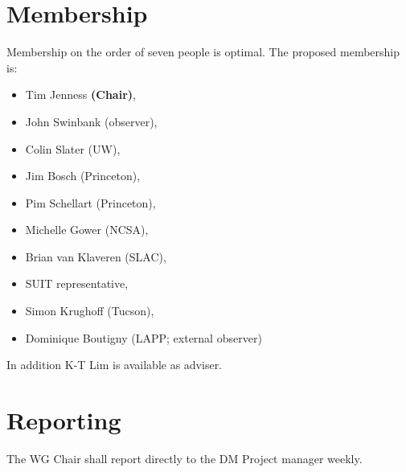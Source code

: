 \section{Membership}

Membership on the order of seven people is optimal.
The proposed membership is:

\begin{itemize}
  \item Tim Jenness \textbf{(Chair)},
  \item John Swinbank (observer),
  \item Colin Slater (UW),
  \item Jim Bosch (Princeton),
  \item Pim Schellart (Princeton),
  \item Michelle Gower (NCSA),
  \item Brian van Klaveren (SLAC),
  \item SUIT representative,
  \item Simon Krughoff (Tucson),
  \item Dominique Boutigny (LAPP; external observer)
\end{itemize}

In addition K-T Lim is available as adviser.

\section{Reporting}

The WG Chair shall report directly to the DM Project manager weekly.

